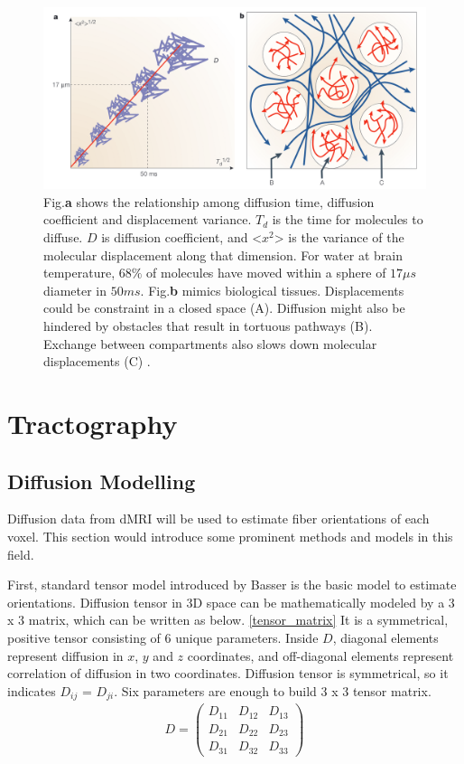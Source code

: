 \begin{figure}[ht]
    \centering
    \includegraphics[width= 12cm]{figures/brownian_motion.png}
        \caption{Fig.\textbf{a} shows the relationship among diffusion time, diffusion coefficient and displacement variance.
        ${T_d}$ is the time for molecules to diffuse. $D$ is diffusion coefficient, 
        and <${x^2}$> is the variance of the molecular displacement along that dimension. 
        For water at brain temperature, $68\%$ of molecules have moved within a sphere of $17 \mu s$ diameter in $50 ms$.
        Fig.\textbf{b} mimics biological tissues. Displacements could be constraint in a closed space (A).
        Diffusion might also be hindered by obstacles that result in tortuous pathways (B).
        Exchange between compartments also slows down molecular displacements (C) \cite*{lebihanLookingFunctionalArchitecture2003}.
        }
    \label{fig:brownian}
\end{figure}


\section{Tractography}
\subsection{Diffusion Modelling}

Diffusion data from dMRI will be used to estimate fiber orientations of each voxel. 
This section would introduce some prominent methods and models in this field.

First, standard tensor model introduced by Basser \cite*{Qof40e4TmpElsevier} is the basic model to estimate orientations.
Diffusion tensor in 3D space can be mathematically modeled by a 3 x 3 matrix, which can be written as below. \ref*{tensor_matrix} 
It is a symmetrical, positive tensor consisting of 6 unique parameters. 
Inside $D$, diagonal elements represent diffusion in $x$, $y$ and $z$ coordinates, 
and off-diagonal elements represent correlation of diffusion in two coordinates. 
Diffusion tensor is symmetrical, so it indicates $D_{ij}$ = $D_{ji}$.
Six parameters are enough to build 3 x 3 tensor matrix. 
\begin{gather}\label{tensor_matrix}
    D = 
    \begin{pmatrix}
        D_{11} & D_{12} & D_{13} \\
        D_{21} & D_{22} & D_{23} \\
        D_{31} & D_{32} & D_{33} 
    \end{pmatrix}
\end{gather}

